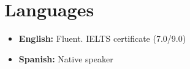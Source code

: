 \documentclass[11pt, letterpaper, sans]{moderncv}        %
\begin{document}
\section{Languages}
\vspace{6pt}

\begin{itemize}
	\item \textbf{English:} Fluent. IELTS certificate (7.0/9.0)
	\item \textbf{Spanish:} Native speaker
	
\end{itemize}

\vfill
\enlargethispage{\footskip}
\let\thefootnote\relax{}
\end{document}
